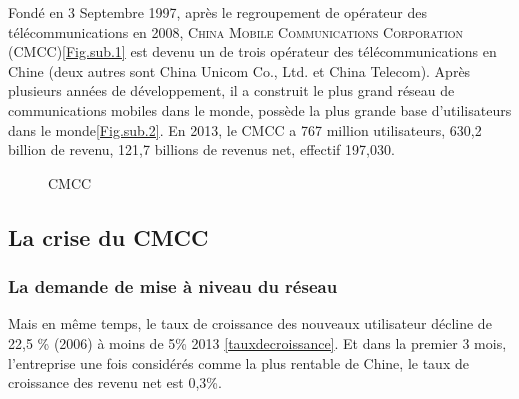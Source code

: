 Fondé en 3 Septembre 1997, après le regroupement de opérateur des télécommunications en 2008, \textsc{China Mobile Communications Corporation} (\textsf{CMCC})\ref{Fig.sub.1} est devenu un de trois opérateur des télécommunications en Chine (deux autres sont \textsf{China Unicom Co., Ltd.} et \textsf{China Telecom}). Après plusieurs années de développement, il a construit le plus grand réseau de communications mobiles dans le monde, possède la plus grande base d'utilisateurs dans le monde\ref{Fig.sub.2}. En 2013, le CMCC a 767 million utilisateurs, 630,2 billion \textyen \qquad de revenu, 121,7 billions \textyen de revenus net, effectif 197,030.
\begin{figure}[H]
	\flushleft
	\hfill
	\hspace{1in}
	\caption{CMCC} 
\end{figure}

\subsection{La crise du CMCC}
\subsubsection{La demande de mise à niveau du réseau}
Mais en même temps, le taux de croissance des nouveaux utilisateur décline de 22,5 \% (2006) à moins de 5\% 2013 \ref{tauxdecroissance}. Et dans la premier 3 mois, l'entreprise une fois considérés comme la plus rentable de Chine, le taux de croissance des revenu net est 0,3\%.

